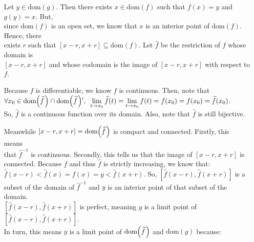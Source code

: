 \documentclass{book}
\newcommand{\pracTwo}{
   \color{Orange}%
   \fontsize{12}{14}\selectfont%
}
\newenvironment{myIndent}{%
   \begin{adjustwidth}{2.5em}{0em}%
}{%
   \end{adjustwidth}%
}
\newcommand{\myHS}{ \hspace{0.5em}}
\newcommand{\domain}[1]{\mathrm{dom}(#1)}
\newcommand{\retTwo}{\hfill\bigbreak}
\begin{document}
{\begin{myIndent}\pracTwo
   Let $y \in \domain{g}$. Then there exists $x \in \domain{f}$ such that $f(x) = y$ and $g(y) = x$. But,\\ since $\domain{f}$ is an open set, we know that $x$ is an interior point of $\domain{f}$. Hence, there\\ [-2pt] exists $r$ such that $[x - r, x + r] \subseteq \domain{f}$. Let $\widehat{f}$ be the restriction of $f$ whose domain is\\ $[x - r, x + r]$ and whose codomain is the image of $[x - r, x + r]$ with respect to $f$.\retTwo
   
   Because $f$ is differentiable, we know $f$ is continuous. Then, note that\\ $\forall x_0 \in \mathrm{dom}\hspace{-0.2em}\left(\widehat{f}\hspace{0.09em}\right) \cap \mathrm{dom}\hspace{-0.2em}\left(\widehat{f}\hspace{0.09em}\right)\hspace{-0.2em}{\displaystyle\vphantom{a}^{\prime}}, \myHS \lim\limits_{t \rightarrow x_0}\widehat{f}(t) = \lim\limits_{t \rightarrow x_0}f(t) = f(x_0) = f(x_0) = \widehat{f}(x_0)$.\\ [-5pt] So, $\widehat{f}$ is a continuous function over its domain. Also, note that $\widehat{f}$ is still bijective.\retTwo

   Meanwhile $[x - r, x + r] = \mathrm{dom}\hspace{-0.2em}\left(\widehat{f}\hspace{0.09em}\right)$ is compact and connected. Firstly, this means\\ [-2pt] that $\widehat{f}^{-1}$ is continuous. Secondly, this tells us that the image of $[x - r, x + r]$ is\\ [2pt]     connected. Because $f$ and thus $\widehat{f}$ is strictly increasing, we know that:\\ [2pt] $\widehat{f}(x - r) < \widehat{f}(x) = f(x) = y < \widehat{f}(x + r)$. So, $[\widehat{f}(x - r), \widehat{f}(x + r)]$ is a subset of the domain of $\widehat{f}^{-1}$ and $y$ is an interior point of that subset of the domain.\\ [6pt]

   $[\widehat{f}(x - r), \widehat{f}(x + r)]$ is perfect, meaning $y$ is a limit point of $[\widehat{f}(x - r), \widehat{f}(x + r)]$.\\ In turn, this means $y$ is a limit point of $\mathrm{dom}\hspace{-0.2em}\left(\widehat{f}\hspace{0.09em}\right)$ and $\domain{g}$ because:
   

\end{myIndent}}
\end{document}
